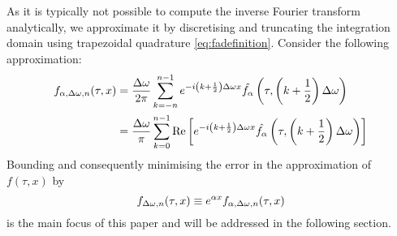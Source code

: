 \documentclass[11pt]{amsart}
\begin{document}
As it is typically not possible to compute the inverse Fourier transform analytically,
we approximate it by
discretising and truncating the integration domain
using trapezoidal quadrature \eqref{eq:fadefinition}.
Consider the following approximation:
\begin{align}
\label{eq:fdiscrete}
 f_{\alpha, \Delta\omega,n} (\tau,x)&= \frac{\Delta\omega}{2\pi} \sum_{k=-n}^{n-1} e^{-i{\left( {k+\frac12} \right)\Delta\omega} x} \hat{f_{\alpha}}\left( {\tau,{\left( {k+\frac12} \right)\Delta\omega}} \right)\\
 &=\frac{\Delta\omega}{\pi} \sum_{k=0}^{n-1} \mathrm{Re}\left[e^{-i{\left( {k+\frac12} \right)\Delta\omega} x} \hat{f_{\alpha}}\left( {\tau,{\left( {k+\frac12} \right)\Delta\omega}} \right)\right]
\end{align} 
Bounding and consequently minimising the error
in the approximation of $f(\tau,x)$ by $$f_{\Delta\omega,n}(\tau,x) \equiv e^{\alpha x}f_{\alpha, \Delta\omega,n}(\tau,x)$$
is the main focus of this paper and will be addressed in the following section.
\end{document}

